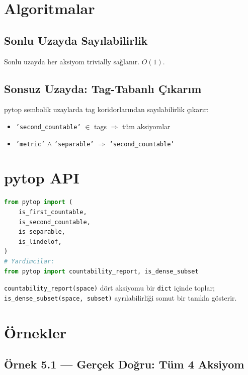 \section{Algoritmalar}

\subsection{Sonlu Uzayda Sayılabilirlik}

Sonlu uzayda her aksiyom trivially sağlanır. $O(1)$.

\subsection{Sonsuz Uzayda: Tag-Tabanlı Çıkarım}

pytop sembolik uzaylarda tag koridorlarından sayılabilirlik çıkarır:
\begin{itemize}
  \item \texttt{'second\_countable'} $\in$ tags $\Rightarrow$ tüm aksiyomlar
  \item \texttt{'metric'} $\wedge$ \texttt{'separable'} $\Rightarrow$ \texttt{'second\_countable'}
\end{itemize}

\section{pytop API}

\begin{lstlisting}[language=Python]
from pytop import (
    is_first_countable,
    is_second_countable,
    is_separable,
    is_lindelof,
)
# Yardimcilar:
from pytop import countability_report, is_dense_subset
\end{lstlisting}

\texttt{countability\_report(space)} dört aksiyomu bir \texttt{dict} içinde
toplar; \texttt{is\_dense\_subset(space, subset)} ayrılabilirliği somut bir
tanıkla gösterir.

\section{Örnekler}

\subsection*{Örnek 5.1 — Gerçek Doğru: Tüm 4 Aksiyom}

